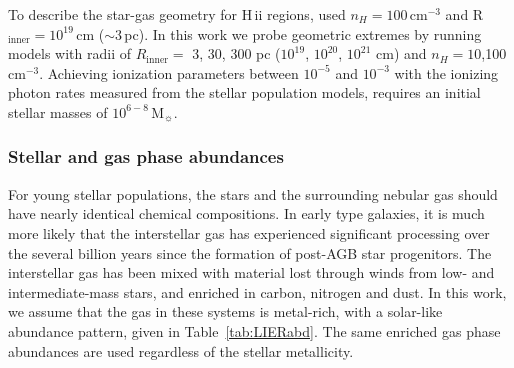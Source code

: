 \documentclass[preprint2]{aastex62}
\newcommand{\hii}{H\,{\sc ii}\xspace}
\newcommand\Msun{\ensuremath{\,\mathrm{M_{\sun}}}\xspace}
\begin{document}
To describe the star-gas geometry for \hii regions, \citet{Byler+2017} used $n_{H}=100\,\mathrm{cm}^{-3}$ and R$_{\mathrm{inner}} = 10^{19}\,$cm (${\sim}3\,$pc). In this work we probe geometric extremes by running models with radii of $R_{\mathrm{inner}} =$ 3, 30, 300 pc ($10^{19}$, $10^{20}$, $10^{21}$ cm) and $n_{H}=10$,100$\,$cm$^{-3}$. Achieving ionization parameters between $10^{-5}$ and $10^{-3}$ with the ionizing photon rates measured from the stellar population models, requires an initial stellar masses of $10^{6-8}\Msun$. 

\subsubsection{Stellar and gas phase abundances}\label{sec:LIERmod:abunds}

For young stellar populations, the stars and the surrounding nebular gas should have nearly identical chemical compositions. In early type galaxies, it is much more likely that the interstellar gas has experienced significant processing over the several billion years since the formation of post-AGB star progenitors. The interstellar gas has been mixed with material lost through winds from low- and intermediate-mass stars, and enriched in carbon, nitrogen and dust. In this work, we assume that the gas in these systems is metal-rich, with a solar-like abundance pattern, given in Table~\ref{tab:LIERabd}. The same enriched gas phase abundances are used regardless of the stellar metallicity.
\end{document}
